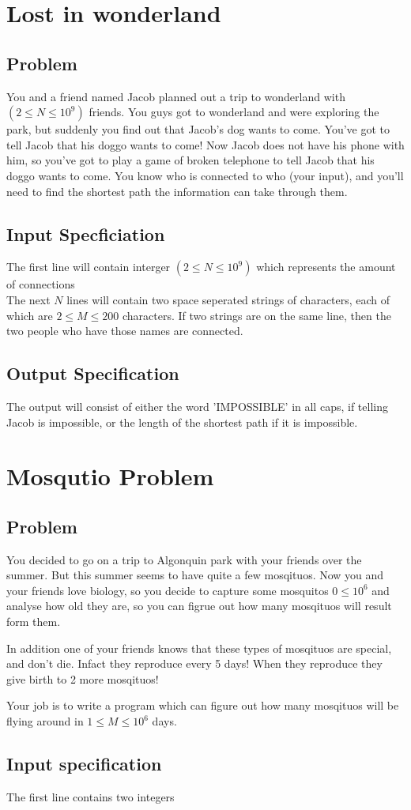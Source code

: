 \documentclass{article}
\begin{document}
\section{Lost in wonderland}
\subsection{Problem}

You and a friend named Jacob planned out a trip to wonderland with \( (2 \leq N \leq 10^{9}) \) friends. You guys got to wonderland and were exploring the park, but suddenly you find out that Jacob's dog wants to come. You've got to tell Jacob that his doggo wants to come! Now Jacob does not have his phone with him, so you've got to play a game of broken telephone to tell Jacob that his doggo wants to come. You know who is connected to who (your input), and you'll need to find the shortest path the information can take through them.

\subsection{Input Specficiation}
The first line will contain interger  \( (2 \leq N \leq 10^{9}) \) which represents the amount of connections \\
The next \(N\) lines will contain two space seperated strings of characters, each of which are \( 2 \leq M \leq 200\) characters. If two strings are on the same line, then the two people who have those names are connected.

\subsection{Output Specification}
The output will consist of either the word 'IMPOSSIBLE' in all caps, if telling Jacob is impossible, or the length of the shortest path if it is impossible.

\section{Mosqutio Problem}
\subsection{Problem}
You decided to go on a trip to Algonquin park with your friends over the summer. But this summer seems to have quite a few mosqituos. Now you and your friends love biology, so you decide to capture some mosquitos \( 0 \leq 10^{6}\) and analyse how old they are, so you can figrue out how many mosqituos will result form them.

In addition one of your friends knows that these types of mosqituos are special, and don't die. Infact they reproduce every 5 days! When they reproduce they give birth to 2 more mosqituos!

Your job is to write a program which can figure out how many mosqituos will be flying around in \( 1 \leq M \leq 10^{6}\) days.

\subsection{Input specification}
The first line contains two integers
\end{document}
